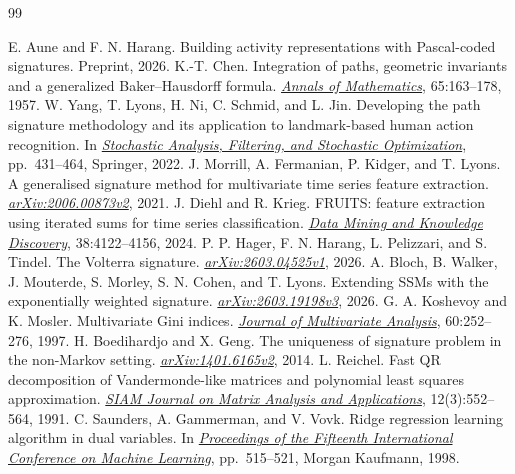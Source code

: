 \begin{thebibliography}{99}
{}
 E. Aune and F. N. Harang. Building activity representations with Pascal-coded signatures. Preprint, 2026.
 K.-T. Chen. Integration of paths, geometric invariants and a generalized Baker--Hausdorff formula. \href{https://doi.org/10.2307/1969671}{\emph{Annals of Mathematics}}, 65:163--178, 1957.
 W. Yang, T. Lyons, H. Ni, C. Schmid, and L. Jin. Developing the path signature methodology and its application to landmark-based human action recognition. In \href{https://doi.org/10.1007/978-3-030-98519-6_18}{\emph{Stochastic Analysis, Filtering, and Stochastic Optimization}}, pp.~431--464, Springer, 2022.
 J. Morrill, A. Fermanian, P. Kidger, and T. Lyons. A generalised signature method for multivariate time series feature extraction. \href{https://arxiv.org/abs/2006.00873v2}{\emph{arXiv:2006.00873v2}}, 2021.
 J. Diehl and R. Krieg. FRUITS: feature extraction using iterated sums for time series classification. \href{https://doi.org/10.1007/s10618-024-01068-1}{\emph{Data Mining and Knowledge Discovery}}, 38:4122--4156, 2024.
 P. P. Hager, F. N. Harang, L. Pelizzari, and S. Tindel. The Volterra signature. \href{https://arxiv.org/abs/2603.04525v1}{\emph{arXiv:2603.04525v1}}, 2026.
 A. Bloch, B. Walker, J. Mouterde, S. Morley, S. N. Cohen, and T. Lyons. Extending SSMs with the exponentially weighted signature. \href{https://arxiv.org/abs/2603.19198v3}{\emph{arXiv:2603.19198v3}}, 2026.
 G. A. Koshevoy and K. Mosler. Multivariate Gini indices. \href{https://wisostat.uni-koeln.de/sites/dep_econometrics/pdf_publikationen/1997_KoshevoyM97a_Gini.pdf}{\emph{Journal of Multivariate Analysis}}, 60:252--276, 1997.
 H. Boedihardjo and X. Geng. The uniqueness of signature problem in the non-Markov setting. \href{https://arxiv.org/abs/1401.6165v2}{\emph{arXiv:1401.6165v2}}, 2014.
 L. Reichel. Fast QR decomposition of Vandermonde-like matrices and polynomial least squares approximation. \href{https://doi.org/10.1137/0612041}{\emph{SIAM Journal on Matrix Analysis and Applications}}, 12(3):552--564, 1991.
 C. Saunders, A. Gammerman, and V. Vovk. Ridge regression learning algorithm in dual variables. In \href{https://pure.royalholloway.ac.uk/en/publications/ridge-regression-learning-algorithm-in-dual-variables/}{\emph{Proceedings of the Fifteenth International Conference on Machine Learning}}, pp.~515--521, Morgan Kaufmann, 1998.

\end{thebibliography}
